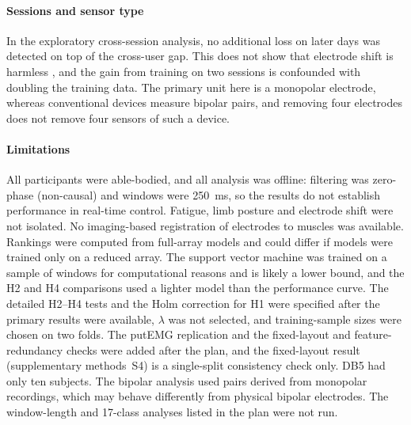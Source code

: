 \paragraph{Sessions and sensor type}
In the exploratory cross-session analysis, no additional loss on later days was detected on top of the cross-user gap. This does not show that electrode shift is harmless \citep{hargrove2006effect,kaufmann2010fluctuating,vidovic2016improving}, and the gain from training on two sessions is confounded with doubling the training data. The primary unit here is a monopolar electrode, whereas conventional devices measure bipolar pairs, and removing four electrodes does not remove four sensors of such a device. %

\paragraph{Limitations}
All participants were able-bodied, and all analysis was offline: filtering was zero-phase (non-causal) and windows were 250~ms, so the results do not establish performance in real-time control. Fatigue, limb posture and electrode shift were not isolated. No imaging-based registration of electrodes to muscles was available. Rankings were computed from full-array models and could differ if models were trained only on a reduced array. The support vector machine was trained on a sample of windows for computational reasons and is likely a lower bound, and the H2 and H4 comparisons used a lighter model than the performance curve. The detailed H2--H4 tests and the Holm correction for H1 were specified after the primary results were available, $\lambda$ was not selected, and training-sample sizes were chosen on two folds. The putEMG replication and the fixed-layout and feature-redundancy checks were added after the plan, and the fixed-layout result (supplementary methods~S4) is a single-split consistency check only. DB5 had only ten subjects. The bipolar analysis used pairs derived from monopolar recordings, which may behave differently from physical bipolar electrodes. The window-length and 17-class analyses listed in the plan were not run.
